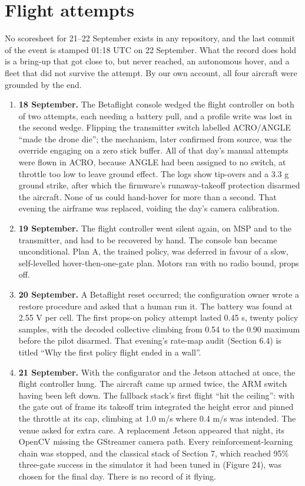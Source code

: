 \documentclass{article}
\begin{document}
\section{Flight attempts}
No scoresheet for 21--22 September exists in any repository, and the last commit of the event is stamped 01:18 UTC on 22 September. What the record does hold is a bring-up that got close to, but never reached, an autonomous hover, and a fleet that did not survive the attempt. By our own account, all four aircraft were grounded by the end.

\begin{enumerate}[leftmargin=*]
\item \textbf{18 September.} The Betaflight console wedged the flight controller on both of two attempts, each needing a battery pull, and a profile write was lost in the second wedge. Flipping the transmitter switch labelled ACRO/ANGLE ``made the drone die''; the mechanism, later confirmed from source, was the override engaging on a zero stick buffer. All of that day's manual attempts were flown in ACRO, because ANGLE had been assigned to no switch, at throttle too low to leave ground effect. The logs show tip-overs and a 3.3 g ground strike, after which the firmware's runaway-takeoff protection disarmed the aircraft. None of us could hand-hover for more than a second. That evening the airframe was replaced, voiding the day's camera calibration.
\item \textbf{19 September.} The flight controller went silent again, on MSP and to the transmitter, and had to be recovered by hand. The console ban became unconditional. Plan A, the trained policy, was deferred in favour of a slow, self-levelled hover-then-one-gate plan. Motors ran with no radio bound, props off.
\item \textbf{20 September.} A Betaflight reset occurred; the configuration owner wrote a restore procedure and asked that a human run it. The battery was found at 2.55 V per cell. The first props-on policy attempt lasted 0.45 s, twenty policy samples, with the decoded collective climbing from 0.54 to the 0.90 maximum before the pilot disarmed. That evening's rate-map audit (Section 6.4) is titled ``Why the first policy flight ended in a wall''.
\item \textbf{21 September.} With the configurator and the Jetson attached at once, the flight controller hung. The aircraft came up armed twice, the ARM switch having been left down. The fallback stack's first flight ``hit the ceiling'': with the gate out of frame its takeoff trim integrated the height error and pinned the throttle at its cap, climbing at 1.0 m/s where 0.4 m/s was intended. The venue asked for extra care. A replacement Jetson appeared that night, its OpenCV missing the GStreamer camera path. Every reinforcement-learning chain was stopped, and the classical stack of Section 7, which reached 95\% three-gate success in the simulator it had been tuned in (Figure 24), was chosen for the final day. There is no record of it flying.
\end{enumerate}
\end{document}
